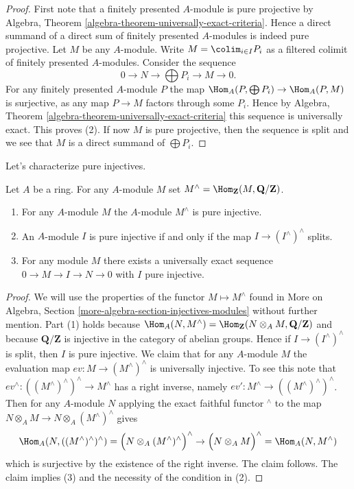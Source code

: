 \begin{proof}
First note that a finitely presented $A$-module is pure projective by
Algebra, Theorem \ref{algebra-theorem-universally-exact-criteria}.
Hence a direct summand of a direct sum of finitely presented $A$-modules
is indeed pure projective. Let $M$ be any $A$-module.
Write $M = \colim_{i \in I} P_i$ as a filtered colimit of
finitely presented $A$-modules. Consider the sequence
$$
0 \to N \to \bigoplus P_i \to M \to 0.
$$
For any finitely presented $A$-module $P$ the map
$\Hom_A(P, \bigoplus P_i) \to \Hom_A(P, M)$
is surjective, as any map $P \to M$ factors through some $P_i$.
Hence by
Algebra, Theorem \ref{algebra-theorem-universally-exact-criteria}
this sequence is universally exact. This proves (2).
If now $M$ is pure projective, then the sequence is split and
we see that $M$ is a direct summand of $\bigoplus P_i$.
\end{proof}

\noindent
Let's characterize pure injectives.

\begin{lemma}
\label{lemma-pure-injective}
Let $A$ be a ring. For any $A$-module $M$ set
$M^\wedge = \Hom_\mathbf{Z}(M, \mathbf{Q}/\mathbf{Z})$.
\begin{enumerate}
\item For any $A$-module $M$ the $A$-module $M^\wedge$ is pure injective.
\item An $A$-module $I$ is pure injective if and only if the map
$I \to (I^\wedge)^\wedge$ splits.
\item For any module $M$ there exists a universally exact sequence
$0 \to M \to I \to N \to 0$ with $I$ pure injective.
\end{enumerate}
\end{lemma}

\begin{proof}
We will use the properties of the functor $M \mapsto M^\wedge$ found in
More on Algebra, Section \ref{more-algebra-section-injectives-modules}
without further mention. Part (1) holds because
$\Hom_A(N, M^\wedge) =
\Hom_\mathbf{Z}(N \otimes_A M, \mathbf{Q}/\mathbf{Z})$
and because $\mathbf{Q}/\mathbf{Z}$ is injective in the category of
abelian groups. Hence if $I \to (I^\wedge)^\wedge$ is split, then
$I$ is pure injective. We claim that for any $A$-module $M$ the
evaluation map $ev : M \to (M^\wedge)^\wedge$ is universally injective.
To see this note that $ev^\wedge : ((M^\wedge)^\wedge)^\wedge \to M^\wedge$
has a right inverse, namely $ev' : M^\wedge \to ((M^\wedge)^\wedge)^\wedge$.
Then for any $A$-module $N$ applying the exact faithful functor
${}^\wedge$ to the map $N \otimes_A M \to N \otimes_A (M^\wedge)^\wedge$
gives
$$
\Hom_A(N, ((M^\wedge)^\wedge)^\wedge) =
\Big(N \otimes_A (M^\wedge)^\wedge\Big)^\wedge
\to
\Big(N \otimes_A M\Big)^\wedge =
\Hom_A(N, M^\wedge)
$$
which is surjective by the existence of the right inverse. The claim follows.
The claim implies (3) and the necessity of the condition in (2).
\end{proof}

